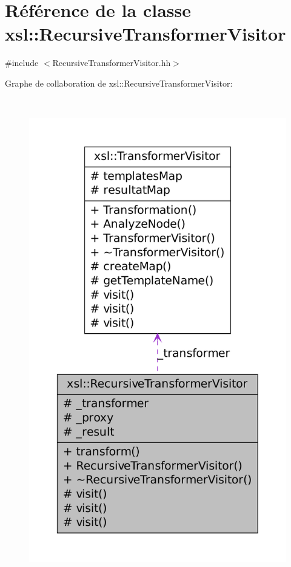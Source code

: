 \hypertarget{classxsl_1_1_recursive_transformer_visitor}{
\section{Référence de la classe xsl::RecursiveTransformerVisitor}
\label{classxsl_1_1_recursive_transformer_visitor}
}


{\ttfamily \#include $<$RecursiveTransformerVisitor.hh$>$}



Graphe de collaboration de xsl::RecursiveTransformerVisitor:\nopagebreak
\begin{figure}[H]
\begin{center}
\leavevmode
\includegraphics[height=600pt]{classxsl_1_1_recursive_transformer_visitor__coll__graph}
\end{center}
\end{figure}
